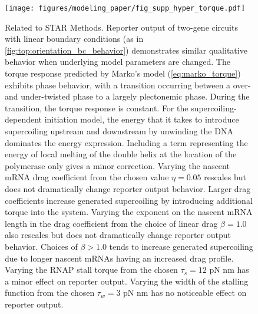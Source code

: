 \documentclass[11pt]{article} %
\begin{document}
\begin{figure}[htbp]
    \centering
    {\texttt{[image: figures/modeling\_paper/fig\_supp\_hyper\_torque.pdf]}
    \label{fig:supp:torque_diagram}
    \label{fig:supp:energy_with_melting}
    \label{fig:hyperparam_drag_coeff}
    \label{fig:hyperparam_drag_exponent}
    \label{fig:hyperparam_stall_torque}
    \label{fig:hyperparam_stall_width}
    }
\end{figure}
\begin{figure}[htbp]
    \ContinuedFloat
    \caption{Related to STAR Methods. Reporter output of two-gene circuits with linear boundary conditions (as in \cref{fig:top:orientation_bc_behavior}) demonstrates similar qualitative behavior when underlying model parameters are changed.
         The torque response predicted by Marko's model (\cref{eq:marko_torque}) exhibits phase behavior, with a transition occurring between a over- and under-twisted phase to a largely plectonemic phase. During the transition, the torque response is constant.
         For the supercoiling-dependent initiation model, the energy that it takes to introduce supercoiling upstream and downstream by unwinding the DNA dominates the energy expression. Including a term representing the energy of local melting of the double helix at the location of the polymerase only gives a minor correction.
         Varying the nascent mRNA drag coefficient from the chosen value \(\eta = 0.05\) rescales but does not dramatically change reporter output behavior. Larger drag coefficients increase generated supercoiling by introducing additional torque into the system.
         Varying the exponent on the nascent mRNA length in the drag coefficient from the choice of linear drag \(\beta = 1.0\) also rescales but does not dramatically change reporter output behavior. Choices of \(\beta > 1.0\) tends to increase generated supercoiling due to longer nascent mRNAs having an increased drag profile.
         Varying the RNAP stall torque from the chosen \(\tau_s = 12\) pN nm has a minor effect on reporter output.
         Varying the width of the stalling function from the chosen \(\tau_w = 3\) pN nm has no noticeable effect on reporter output.
    }
    \label{fig:top:supp_hyperparams}
\end{figure}
\end{document}

